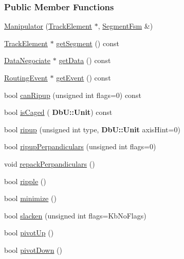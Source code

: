 \subsubsection*{Public Member Functions}
\begin{DoxyCompactItemize}
\item 
\hyperlink{classKite_1_1Manipulator_ac02c770e24b6ff747867adcb7c4da92e}{Manipulator} (\hyperlink{classKite_1_1TrackElement}{Track\+Element} $\ast$, \hyperlink{classKite_1_1SegmentFsm}{Segment\+Fsm} \&)
\item 
\hyperlink{classKite_1_1TrackElement}{Track\+Element} $\ast$ \hyperlink{classKite_1_1Manipulator_a506a4d1cef59fc35984c1c88e0c0f6df}{get\+Segment} () const
\item 
\hyperlink{classKite_1_1DataNegociate}{Data\+Negociate} $\ast$ \hyperlink{classKite_1_1Manipulator_a54ca9d3c6d8ea145e053a37be8be8753}{get\+Data} () const
\item 
\hyperlink{classKite_1_1RoutingEvent}{Routing\+Event} $\ast$ \hyperlink{classKite_1_1Manipulator_a513f39c546ef4be0d13787cdace4eadf}{get\+Event} () const
\item 
bool \hyperlink{classKite_1_1Manipulator_acae2506c976194aef762d27900c97b02}{can\+Ripup} (unsigned int flags=0) const
\item 
bool \hyperlink{classKite_1_1Manipulator_a722e514efb92d4a05e4f4d9e1fe7f94b}{is\+Caged} (\textbf{ Db\+U\+::\+Unit}) const
\item 
bool \hyperlink{classKite_1_1Manipulator_a370b5a5373d3019510d4ec22f44c76c2}{ripup} (unsigned int type, \textbf{ Db\+U\+::\+Unit} axis\+Hint=0)
\item 
bool \hyperlink{classKite_1_1Manipulator_a147c24aa53f561c10d5d24b82b03448a}{ripup\+Perpandiculars} (unsigned int flags=0)
\item 
void \hyperlink{classKite_1_1Manipulator_a9721ea909a9b11297dea855e1ba82a55}{repack\+Perpandiculars} ()
\item 
bool \hyperlink{classKite_1_1Manipulator_af46102d49a7aa0c163de1bf143807794}{ripple} ()
\item 
bool \hyperlink{classKite_1_1Manipulator_aa61f08642d981761687635be108b9837}{minimize} ()
\item 
bool \hyperlink{classKite_1_1Manipulator_a82897c077e4c0d4281c3dce3e37ab997}{slacken} (unsigned int flags=Kb\+No\+Flags)
\item 
bool \hyperlink{classKite_1_1Manipulator_ad590137c4e7e8d5ad2a6f510e0d70e81}{pivot\+Up} ()
\item 
bool \hyperlink{classKite_1_1Manipulator_ac3b48ad16d9b9b63d1c68e526ceb42e8}{pivot\+Down} ()

\end{DoxyCompactItemize}
